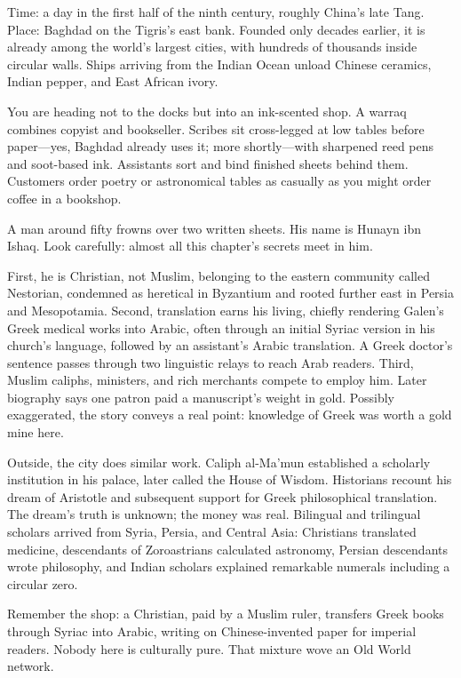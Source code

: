 Time: a day in the first half of the ninth century, roughly China's late Tang. Place: Baghdad on the Tigris's east bank. Founded only decades earlier, it is already among the world's largest cities, with hundreds of thousands inside circular walls. Ships arriving from the Indian Ocean unload Chinese ceramics, Indian pepper, and East African ivory.

You are heading not to the docks but into an ink-scented shop. A warraq combines copyist and bookseller. Scribes sit cross-legged at low tables before paper---yes, Baghdad already uses it; more shortly---with sharpened reed pens and soot-based ink. Assistants sort and bind finished sheets behind them. Customers order poetry or astronomical tables as casually as you might order coffee in a bookshop.

A man around fifty frowns over two written sheets. His name is Hunayn ibn Ishaq. Look carefully: almost all this chapter's secrets meet in him.

First, he is Christian, not Muslim, belonging to the eastern community called Nestorian, condemned as heretical in Byzantium and rooted further east in Persia and Mesopotamia. Second, translation earns his living, chiefly rendering Galen's Greek medical works into Arabic, often through an initial Syriac version in his church's language, followed by an assistant's Arabic translation. A Greek doctor's sentence passes through two linguistic relays to reach Arab readers. Third, Muslim caliphs, ministers, and rich merchants compete to employ him. Later biography says one patron paid a manuscript's weight in gold. Possibly exaggerated, the story conveys a real point: knowledge of Greek was worth a gold mine here.

Outside, the city does similar work. Caliph al-Ma'mun established a scholarly institution in his palace, later called the House of Wisdom. Historians recount his dream of Aristotle and subsequent support for Greek philosophical translation. The dream's truth is unknown; the money was real. Bilingual and trilingual scholars arrived from Syria, Persia, and Central Asia: Christians translated medicine, descendants of Zoroastrians calculated astronomy, Persian descendants wrote philosophy, and Indian scholars explained remarkable numerals including a circular zero.

Remember the shop: a Christian, paid by a Muslim ruler, transfers Greek books through Syriac into Arabic, writing on Chinese-invented paper for imperial readers. Nobody here is culturally pure. That mixture wove an Old World network.


